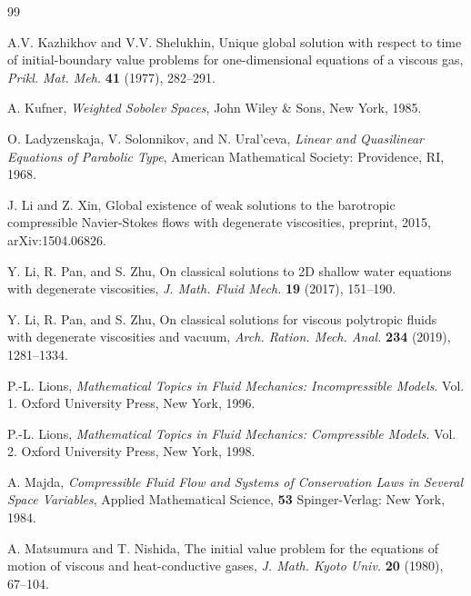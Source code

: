 \documentclass[11pt,reqno]{amsart}
\numberwithin{rk}{section}
\numberwithin{prop}{section}
\numberwithin{mydef}{section}
\numberwithin{lem}{section}
\numberwithin{equation}{section}
\numberwithin{thm}{section}
\begin{document}
\begin{thebibliography}{99}
 
 A.V. Kazhikhov and V.V. Shelukhin,  Unique global solution with respect to time of initial-boundary value problems for one-dimensional equations of a viscous gas,  \textit{Prikl. Mat. Meh.} \textbf{41} (1977), 282--291.





 A. Kufner, {\sl Weighted Sobolev Spaces}, John Wiley \& Sons, New York, 1985.



	 O.  Ladyzenskaja, V. Solonnikov, and N. Ural'ceva,\textit{ Linear and Quasilinear Equations of Parabolic Type}, American Mathematical Society: Providence, RI, 1968.
	



 J. Li and Z. Xin, Global existence of weak solutions to the barotropic compressible Navier-Stokes flows with degenerate viscosities, preprint, 2015, arXiv:1504.06826.



 Y. Li, R. Pan, and S. Zhu, On classical solutions to 2D shallow water equations with degenerate viscosities,  \textit{J.  Math. Fluid  Mech.} \textbf{19} (2017), 151--190.


 Y. Li, R. Pan, and S. Zhu, On classical solutions for viscous polytropic fluids with degenerate viscosities  and vacuum,  \textit{Arch. Ration. Mech. Anal.} \textbf{234} (2019), 1281--1334.





 P.-L. Lions, \textit{ Mathematical Topics in Fluid Mechanics{\rm :} Incompressible Models}. Vol. 1. Oxford University Press, New York, 1996.


 P.-L. Lions, \textit{ Mathematical Topics in Fluid Mechanics{\rm :} Compressible Models}. Vol. 2. Oxford University Press, New York, 1998.


	 A. Majda, \textit{Compressible Fluid Flow and Systems of Conservation Laws in Several Space Variables}, Applied Mathematical Science, \textbf{53} Spinger-Verlag: New York,  1984.




  A.  Matsumura and T. Nishida, The initial value problem for the equations of motion of viscous and heat-conductive gases,  \textit{J. Math. Kyoto Univ.} \textbf{20} (1980), 67--104.






\end{thebibliography}
\end{document}

